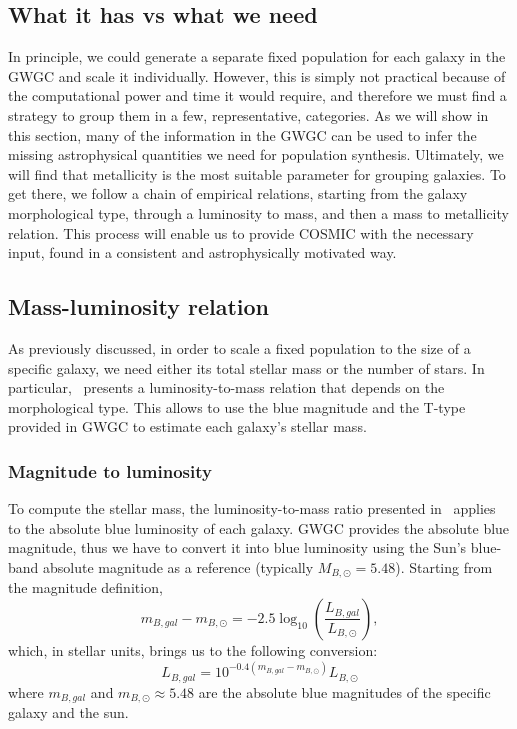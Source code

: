 \subsection{What it has vs what we need}
In principle, we could generate a separate fixed population for each galaxy in the GWGC and scale it individually.
However, this is simply not practical because of the computational power and time it would require, and therefore we must find a strategy to group them in a few, representative, categories.
As we will show in this section, many of the information in the GWGC can be used to infer the missing astrophysical quantities we need for population synthesis. 
Ultimately, we will find that metallicity is the most suitable parameter for grouping galaxies.
To get there, we follow a chain of empirical relations, starting from the galaxy morphological type, through  a luminosity to mass, and then a mass to metallicity relation. 
This process will enable us to provide COSMIC with the necessary input, found in a consistent and astrophysically motivated way.



\subsection{Mass-luminosity relation}

As previously discussed, in order to scale a fixed population to the size of a specific galaxy, we need either its total stellar mass or the number of stars.
In particular,~\cite{Faber&Gallagher} presents a luminosity-to-mass relation that depends on the morphological type.
This allows to use the blue magnitude and the T-type provided in GWGC to estimate each galaxy's stellar mass.

\subsubsection{Magnitude to luminosity}
To compute the stellar mass, the luminosity-to-mass ratio presented in~\cite{Faber&Gallagher} applies to the absolute blue luminosity of each galaxy.
GWGC provides the absolute blue magnitude, thus we have to convert it into blue luminosity using the Sun's blue-band absolute magnitude as a reference (typically $M_{B,\odot} = 5.48$).
Starting from the magnitude definition,
\[
    m_{B,gal} - m_{B,\odot} = -2.5\log_10\left(\frac{L_{B,gal}}{L_{B,\odot}}\right),
\]
which, in stellar units, brings us to the following conversion:
\begin{equation}
    L_{B,gal} = 10^{-0.4(m_{B,gal}-m_{B,\odot})}L_{B,\odot}
    \label{eq: magnitude to luminosity}
\end{equation}
where $m_{B,gal}$ and $m_{B,\odot}\approx 5.48$ are the absolute blue magnitudes of the specific galaxy and the sun.

